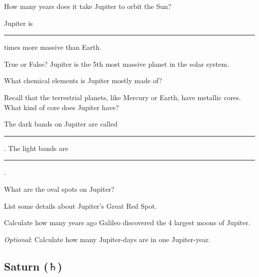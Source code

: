 \documentclass{article}
\numberwithin{equation}{section}
\numberwithin{figure}{section}
\begin{document}
\begin{exercise}
    How many years does it take Jupiter to orbit the Sun?
\end{exercise}

\begin{exercise}
    Jupiter is \rule{1cm}{0.15mm} times more massive than Earth.
\end{exercise}

\begin{exercise}
    True or False? Jupiter is the 5th most massive planet in the solar system.
\end{exercise}

\begin{exercise}
    What chemical elements is Jupiter mostly made of?
\end{exercise}

\begin{exercise}
    Recall that the terrestrial planets, like Mercury or Earth, have metallic cores. What kind of core does Jupiter have?
\end{exercise}

\begin{exercise}
    The dark bands on Jupiter are called \rule{2cm}{0.15mm}. The light bands are \rule{2cm}{0.15mm}.
\end{exercise}

\begin{exercise}
    What are the oval spots on Jupiter?
\end{exercise}

\begin{exercise}
    List some details about Jupiter's Great Red Spot.
\end{exercise}

\begin{exercise}
    Calculate how many years ago Galileo discovered the 4 largest moons of Jupiter.
\end{exercise}

\begin{exercise}
    \textit{Optional}: Calculate how many Jupiter-days are in one Jupiter-year.
\end{exercise}


\clearpage
\subsection{Saturn ($\Saturn$)} \label{qBDig}
\end{document}
